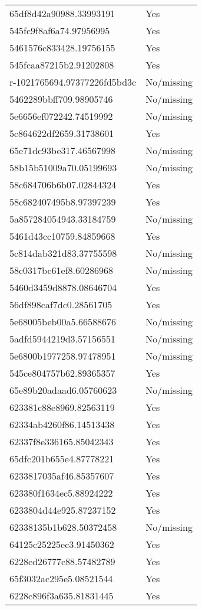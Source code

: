 \begin{tabular}{ll}
65df8d42a90988.33993191 & Yes \\
545fc9f8af6a74.97956995 & Yes \\
5461576c833428.19756155 & Yes \\
545fcaa87215b2.91202808 & Yes \\
r-1021765694.97377226fd5bd3c & No/missing \\
5462289bbff709.98905746 & No/missing \\
5e6656ef072242.74519992 & No/missing \\
5c864622df2659.31738601 & Yes \\
65e71dc93be317.46567998 & No/missing \\
58b15b51009a70.05199693 & No/missing \\
58c684706b6b07.02844324 & Yes \\
58c682407495b8.97397239 & Yes \\
5a857284054943.33184759 & No/missing \\
5461d43cc10759.84859668 & Yes \\
5c814dab321d83.37755598 & No/missing \\
58c0317bc61ef8.60286968 & No/missing \\
5460d3459d8878.08646704 & Yes \\
56df898caf7dc0.28561705 & Yes \\
5e68005beb00a5.66588676 & No/missing \\
5adfd5944219d3.57156551 & No/missing \\
5e6800b1977258.97478951 & No/missing \\
545ce804757b62.89365357 & Yes \\
65e89b20adaad6.05760623 & No/missing \\
623381c88e8969.82563119 & Yes \\
62334ab4260f86.14513438 & Yes \\
62337f8e336165.85042343 & Yes \\
65dfc201b655e4.87778221 & Yes \\
6233817035af46.85357607 & Yes \\
623380f1634ec5.88924222 & Yes \\
6233804d44e925.87237152 & Yes \\
62338135b1b628.50372458 & No/missing \\
64125c25225ec3.91450362 & Yes \\
6228cd26777c88.57482789 & Yes \\
65f3032ac295e5.08521544 & Yes \\
6228c896f3a635.81831445 & Yes \\

\end{tabular}
